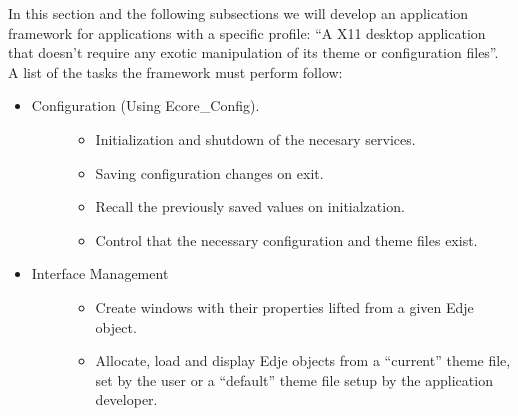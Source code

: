 \documentclass[12pt,a4paper,english]{book}
\begin{document}
In this section and the following subsections we will develop an application
framework for applications with a specific profile: ``A X11 desktop application
that doesn't require any exotic manipulation of its theme or configuration
files''. A list of the tasks the framework must perform follow:
\begin{itemize}
\item {} \begin{description}
\item[{Configuration (Using Ecore{\_}Config).}] \leavevmode \begin{itemize}
\item {} 
Initialization and shutdown of the necesary services.

\item {} 
Saving configuration changes on exit.

\item {} 
Recall the previously saved values on initialzation.

\item {} 
Control that the necessary configuration and theme files exist.

\end{itemize}

\end{description}

\item {} \begin{description}
\item[{Interface Management}] \leavevmode \begin{itemize}
\item {} 
Create windows with their properties lifted from a given Edje object.

\item {} 
Allocate, load and display Edje objects from a ``current'' theme file, set
by the user or a ``default'' theme file setup by the application developer.

\end{itemize}

\end{description}

\end{itemize}
\end{document}

